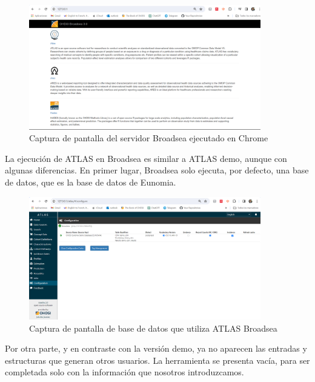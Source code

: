 \documentclass{article}
\begin{document}
\begin{enumerate}
\begin{figure}[H]
    \centering
    \includegraphics[width=0.90\textwidth]{images/broadseaCap.png}
     \caption{Captura de pantalla del servidor Broadsea ejecutado en Chrome}
    \label{fig:broadseaCap}
\end{figure}

    La ejecución de ATLAS en Broadsea es similar a ATLAS demo, aunque con algunas diferencias. En primer lugar, Broadsea solo ejecuta, por defecto, una base de datos, que es la base de datos de Eunomia.

\begin{figure}[H]
    \centering
    \includegraphics[width=0.90\textwidth]{images/atlasBroadseaDB.png}
     \caption{Captura de pantalla de base de datos que utiliza ATLAS Broadsea}
    \label{fig:atlasBroadseaDB}
\end{figure}

    Por otra parte, y en contraste con la versión demo, ya no aparecen las entradas y estructuras que generan otros usuarios. La herramienta se presenta vacía, para ser completada solo con la información que nosotros introduzcamos.


\end{enumerate}
\end{document}
